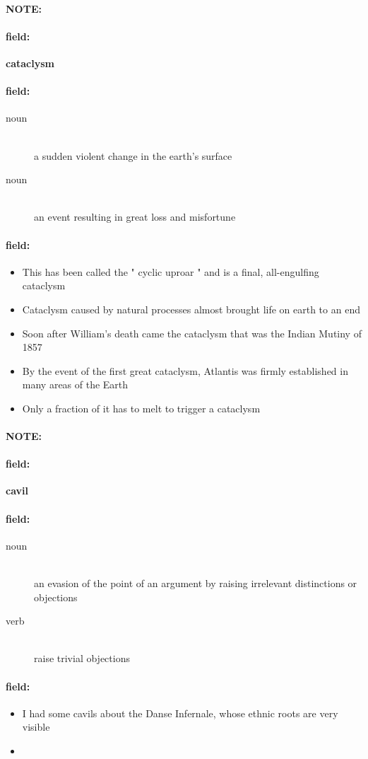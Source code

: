 \documentclass[12pt]{article}
\newenvironment{note}{\paragraph{NOTE:}}{}
\newenvironment{field}{\paragraph{field:}}{}
\begin{document}
\begin{note}
\begin{field}
\textbf{\large cataclysm}
\end{field}


\begin{field}
\begin{description}
\item[noun] \hfill \\ 
a sudden violent change in the earth's surface

\item[noun] \hfill \\ 
an event resulting in great loss and misfortune

\end{description}
\end{field}

\begin{field}
\begin{itemize}
\item This has been called the " cyclic uproar " and is a final, all-engulfing cataclysm
\item Cataclysm caused by natural processes almost brought life on earth to an end
\item Soon after William's death came the cataclysm that was the Indian Mutiny of 1857
\item By the event of the first great cataclysm, Atlantis was firmly established in many areas of the Earth
\item Only a fraction of it has to melt to trigger a cataclysm
\end{itemize}
\end{field}
\end{note}
\begin{note}
\begin{field}
\textbf{\large cavil}
\end{field}


\begin{field}
\begin{description}
\item[noun] \hfill \\ 
an evasion of the point of an argument by raising irrelevant distinctions or objections

\item[verb] \hfill \\ 
raise trivial objections

\end{description}
\end{field}

\begin{field}
\begin{itemize}
\item I had some cavils about the Danse Infernale, whose ethnic roots are very visible
\item 
\end{itemize}
\end{field}
\end{note}
\end{document}
